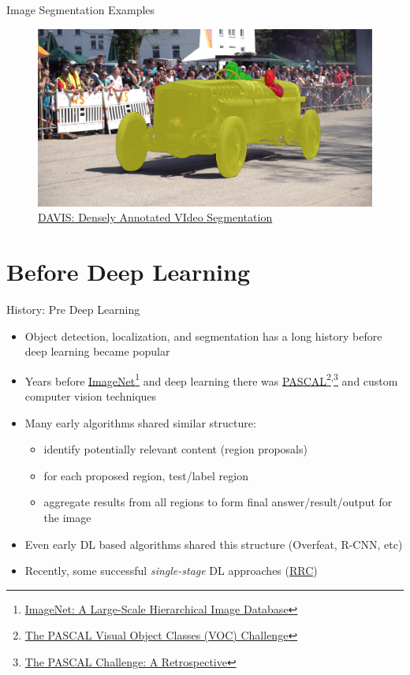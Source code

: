 \documentclass[handout]{beamer}
\begin{document}
\begin{frame}{Image Segmentation Examples}
\begin{figure}
\includegraphics[width=\textwidth]{../media/davis_1.png}
\caption{\href{http://davischallenge.org/index.html}{\color{blue}DAVIS: Densely Annotated VIdeo Segmentation}}
\end{figure}
\end{frame}

\section{Before Deep Learning}  

\begin{frame}{History: Pre Deep Learning}
\begin{itemize}
  \item<1-> Object detection, localization, and segmentation has a long history before deep learning became popular
  \item<2-> Years before \href{http://www.image-net.org}{\color{blue}ImageNet}\footnote{\href{http://www.image-net.org/papers/imagenet_cvpr09.pdf}{\color{blue}ImageNet: A Large-Scale Hierarchical Image Database}} and deep learning there was \href{http://host.robots.ox.ac.uk/pascal/VOC/}{\color{blue}PASCAL}\footnote{\href{http://host.robots.ox.ac.uk/pascal/VOC/pubs/everingham10.html\#abstract}{\color{blue}The PASCAL Visual Object Classes (VOC) Challenge}}\textsuperscript{,}\footnote{\href{http://host.robots.ox.ac.uk/pascal/VOC/pubs/everingham15.html\#abstract}{\color{blue}The PASCAL Challenge: A Retrospective}} and custom computer vision techniques
  \item<3-> Many early algorithms shared similar structure:
  \begin{itemize}
  	\item<1->identify potentially relevant content (region proposals)
	\item<2->for each proposed region, test/label region 
	\item<3->aggregate results from all regions to form final answer/result/output for the image
  \end{itemize}
  \item<4->Even early DL based algorithms shared this structure (Overfeat, R-CNN, etc)
  \item<5->Recently, some successful \emph{single-stage} DL approaches (\href{https://arxiv.org/abs/1704.05776}{\color{blue}RRC})
\end{itemize}
\end{frame}
\end{document}
